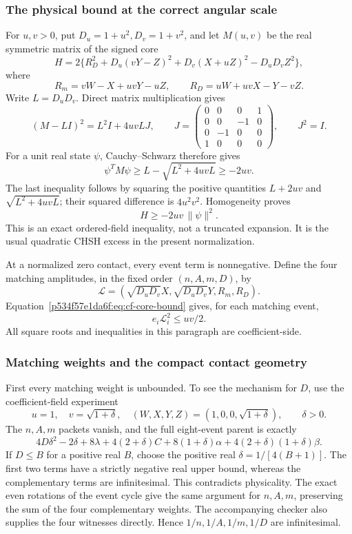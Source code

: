 \subsubsection*{The physical bound at the correct angular scale}
For \(u,v>0\), put \(D_u=1+u^2,D_v=1+v^2\), and let \(M(u,v)\) be the
real symmetric matrix of the signed core
\[
H=2\{R_D^2+D_u(vY-Z)^2+D_v(X+uZ)^2-D_uD_vZ^2\},
\]
where
\[
R_m=vW-X+uvY-uZ,\qquad R_D=uW+uvX-Y-vZ.
\]
Write \(L=D_uD_v\). Direct matrix multiplication gives
\begin{equation}
(M-LI)^2=L^2I+4uvLJ,\qquad
J=\begin{pmatrix}0&0&0&1\\0&0&-1&0\\0&-1&0&0\\1&0&0&0\end{pmatrix},
\qquad J^2=I.                                      \label{p534f57e1da6f:eq:cf-core-square}
\end{equation}
For a unit real state \(\psi\), Cauchy--Schwarz therefore gives
\[
\psi^TM\psi\ge L-\sqrt{L^2+4uvL}\ge-2uv.
\]
The last inequality follows by squaring the positive quantities
\(L+2uv\) and \(\sqrt{L^2+4uvL}\); their squared difference is
\(4u^2v^2\). Homogeneity proves
\begin{equation}
                         H\ge-2uv\,\|\psi\|^2.        \label{p534f57e1da6f:eq:cf-core-bound}
\end{equation}
This is an exact ordered-field inequality, not a truncated expansion.
It is the usual quadratic CHSH excess in the present normalization.

At a normalized zero contact, every event term is nonnegative. Define
the four matching amplitudes, in the fixed order \((n,A,m,D)\), by
\[
\mathcal L=(\sqrt{D_uD_v}X,\sqrt{D_uD_v}Y,R_m,R_D).
\]
Equation~\eqref{p534f57e1da6f:eq:cf-core-bound} gives, for each matching event,
\begin{equation}
                   e_i\mathcal L_i^2\le uv/2.         \label{p534f57e1da6f:eq:cf-amplitude-bound}
\end{equation}
All square roots and inequalities in this paragraph are coefficient-side.

\subsubsection*{Matching weights and the compact contact geometry}
First every matching weight is unbounded. To see the mechanism for
\(D\), use the coefficient-field experiment
\[
 u=1,\quad v=\sqrt{1+\delta},\quad
 (W,X,Y,Z)=(1,0,0,\sqrt{1+\delta}),\qquad\delta>0.
\]
The \(n,A,m\) packets vanish, and the full eight-event parent is exactly
\[
4D\delta^2-2\delta+8\lambda+4(2+\delta)C
 +8(1+\delta)\alpha+4(2+\delta)(1+\delta)\beta.
\]
If \(D\le B\) for a positive real \(B\), choose the positive real
\(\delta=1/[4(B+1)]\). The first two terms have a strictly negative
real upper bound, whereas the complementary terms are infinitesimal.
This contradicts physicality. The exact even rotations of the event
cycle give the same argument for \(n,A,m\), preserving the sum of the
four complementary weights. The accompanying checker also supplies
the four witnesses directly. Hence \(1/n,1/A,1/m,1/D\) are infinitesimal.

